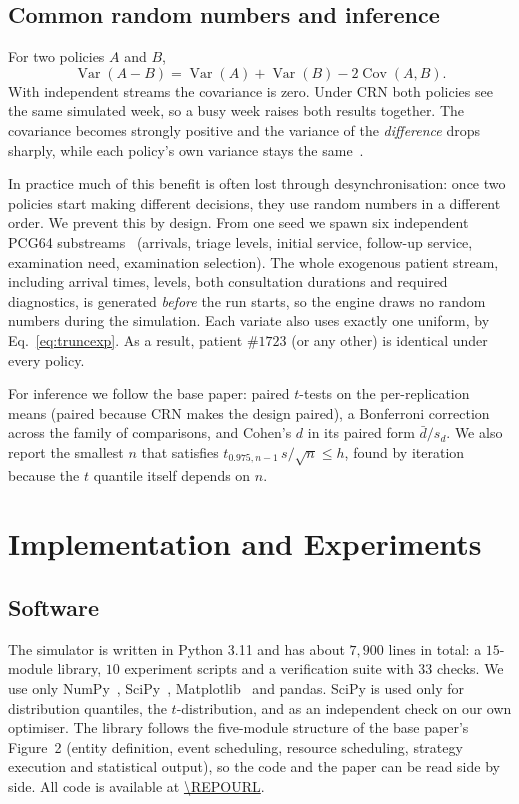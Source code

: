 \documentclass[sigconf,nonacm]{acmart}
\begin{document}
\subsection{Common random numbers and inference}
\label{sec:crn}
For two policies $A$ and $B$,
\begin{equation}
\operatorname{Var}(A-B) = \operatorname{Var}(A) + \operatorname{Var}(B)
                        - 2\operatorname{Cov}(A,B).
\label{eq:crn}
\end{equation}
With independent streams the covariance is zero. Under CRN both policies see
the same simulated week, so a busy week raises both results together. The
covariance becomes strongly positive and the variance of the
\emph{difference} drops sharply, while each policy's own variance stays the
same~\cite{law2015simulation}.

In practice much of this benefit is often lost through desynchronisation: once
two policies start making different decisions, they use random numbers in a
different order. We prevent this by design. From one seed we spawn six
independent PCG64 substreams~\cite{oneill2014pcg} (arrivals, triage levels,
initial service, follow-up service, examination need, examination selection).
The whole exogenous patient stream, including arrival times, levels, both
consultation durations and required diagnostics, is generated \emph{before}
the run starts, so the engine draws no random numbers during the simulation.
Each variate also uses exactly one uniform, by Eq.~\eqref{eq:truncexp}. As a
result, patient $\#1723$ (or any other) is identical under every policy.

For inference we follow the base paper: paired $t$-tests on the
per-replication means (paired because CRN makes the design paired), a
Bonferroni correction across the family of comparisons, and Cohen's $d$ in its
paired form $\bar{d}/s_d$. We also report the smallest $n$ that satisfies
$t_{0.975,n-1}\,s/\sqrt{n} \le h$, found by iteration because the $t$ quantile
itself depends on $n$.

\section{Implementation and Experiments}
\label{sec:impl}

\subsection{Software}
The simulator is written in Python 3.11 and has about $7{,}900$ lines in
total: a $15$-module library, $10$ experiment scripts and a verification suite
with $33$ checks. We use only NumPy~\cite{harris2020numpy},
SciPy~\cite{virtanen2020scipy}, Matplotlib~\cite{hunter2007matplotlib} and
pandas. SciPy is used only for distribution quantiles, the $t$-distribution,
and as an independent check on our own optimiser. The library follows the
five-module structure of the base paper's Figure~2 (entity definition, event
scheduling, resource scheduling, strategy execution and statistical output),
so the code and the paper can be read side by side. All code is available at
\url{\REPOURL}.
\end{document}
